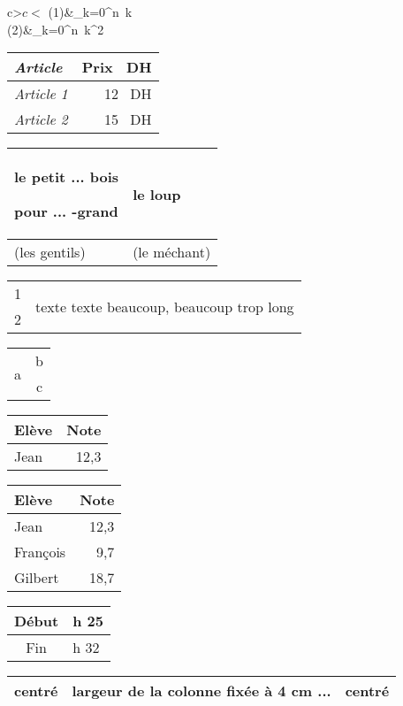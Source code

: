 \documentclass[12pt,a4paper,oneside,twocolumn]{article} %
\numberwithin{equation}{section}
\begin{document}
\begin{tabular}{c>$c<$}
\hline
(1)&\sum_{k=0}^{n}\ k \\ \hline
(2)&\sum_{k=0}^{n}\ k^2\\ \hline
\end{tabular}


\begin{tabular}{>{\itshape}l r<{~DH}}
Article & Prix \\ 
\hline
Article 1 & 12 \\ 
Article 2 & 15 \\
\end{tabular}

\begin{tabular}{|p{5cm}|l|}
\hline
le petit ... bois\par pour ... -grand
& le loup \\ \hline
(les gentils) & (le méchant)\\
\hline \end{tabular}

\begin{tabular}{|c|p{4cm}|}
\hline
1&\multirow{2}{4cm}{texte texte beaucoup, beaucoup trop long }\\
\cline{1-1}
2&\\
\hline
\end{tabular}

\begin{tabular}{|c|c|}
\hline
\multirow{2}{*}{a} & b\\
\cline{2-2}
  & c\\
\hline
\end{tabular}

\begin{tabular}{|p{2cm}|r|}
\hline
\centering Elève & Note\\ \hline
Jean & 12,3 \\ \hline
\end{tabular}

\begin{tabular}{|>{\centering}p{2cm}|r|}
\hline
Elève& Note\tabularnewline
\hline
Jean& 12,3 \tabularnewline \hline
François & 9,7\tabularnewline \hline
Gilbert& 18,7\\
\hline
\end{tabular}

\begin{tabular}{|c|>{\raggedleft}m{2cm}|}
\hline
Début & 14 h 25 \tabularnewline
\hline
Fin & 15 h 32 \tabularnewline
\hline
\end{tabular}
\begin{tabular}{|c|b{4cm}|c|}
\hline
centré & largeur de la colonne fixée à 4 cm ... & centré \\
\hline
\end{tabular}
\end{document}
